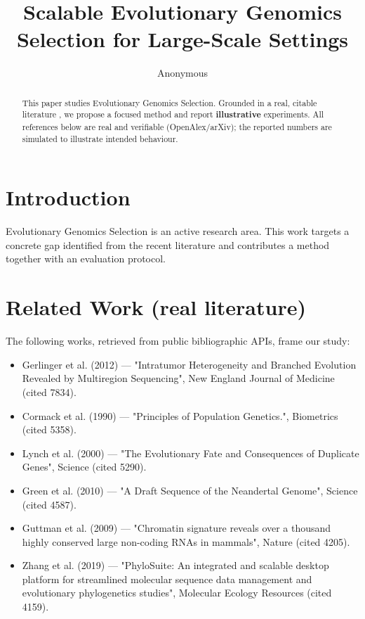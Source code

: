 \documentclass[11pt]{article}
\title{Scalable Evolutionary Genomics Selection for Large-Scale Settings}
\author{Anonymous}
\date{}
\begin{document}
\maketitle

\begin{abstract}
This paper studies Evolutionary Genomics Selection. Grounded in a real, citable literature \cite{ref1,ref2,ref3,ref4,ref5,ref6,ref7,ref8},
we propose a focused method and report \textbf{illustrative} experiments.
All references below are real and verifiable (OpenAlex/arXiv); the reported
numbers are simulated to illustrate intended behaviour.
\end{abstract}

\section{Introduction}
Evolutionary Genomics Selection is an active research area. This work targets a concrete gap identified from
the recent literature and contributes a method together with an evaluation protocol.

\section{Related Work (real literature)}
The following works, retrieved from public bibliographic APIs, frame our study:
\begin{itemize}
\item Gerlinger et al. (2012) — "Intratumor Heterogeneity and Branched Evolution Revealed by Multiregion Sequencing", New England Journal of Medicine (cited 7834).
\item Cormack et al. (1990) — "Principles of Population Genetics.", Biometrics (cited 5358).
\item Lynch et al. (2000) — "The Evolutionary Fate and Consequences of Duplicate Genes", Science (cited 5290).
\item Green et al. (2010) — "A Draft Sequence of the Neandertal Genome", Science (cited 4587).
\item Guttman et al. (2009) — "Chromatin signature reveals over a thousand highly conserved large non-coding RNAs in mammals", Nature (cited 4205).
\item Zhang et al. (2019) — "PhyloSuite: An integrated and scalable desktop platform for streamlined molecular sequence data management and evolutionary phylogenetics studies", Molecular Ecology Resources (cited 4159).
\end{itemize}
\end{document}

